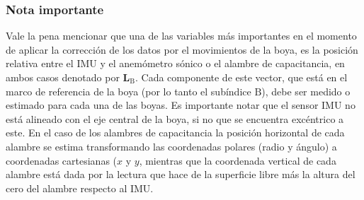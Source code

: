 \documentclass[11pt]{article}
\begin{document}
\subsubsection*{Nota importante}%
\label{ssub:nota_importante}

Vale la pena mencionar que una de las variables más importantes
en el momento de aplicar la corrección de los datos por el movimientos de la
boya, es la posición relativa entre el IMU y el anemómetro sónico o el alambre
de capacitancia, en ambos casos denotado por $\mathbf{L}_\mathrm{B}$. Cada
componente de este vector, que está en el marco de referencia de la boya (por
lo tanto el subíndice $\mathrm{B}$), debe ser medido o estimado para cada una de
las boyas. Es importante notar que el sensor IMU no está alineado con el eje
central de la boya, si no que se encuentra excéntrico a este. En el caso de los
alambres de capacitancia la posición horizontal de cada alambre se estima
transformando las coordenadas polares (radio y ángulo) a coordenadas
cartesianas ($x$ y $y$, mientras que la coordenada vertical de cada alambre está
dada por la lectura que hace de la superficie libre más la altura del cero del
alambre respecto al IMU.



\end{document}
